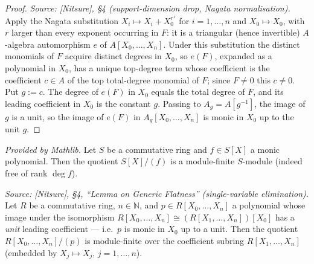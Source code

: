 \begin{proof}

\leanok
  \textit{Source: [Nitsure], \S4 (support-dimension drop, Nagata normalisation).}
  Apply the Nagata substitution \(X_i \mapsto X_i + X_0^{r^{\,i}}\) for \(i = 1, \dots, n\)
  and \(X_0 \mapsto X_0\), with \(r\) larger than every exponent occurring in \(F\): it is a
  triangular (hence invertible) \(A\)-algebra automorphism \(e\) of \(A[X_0, \dots, X_n]\).
  Under this substitution the distinct monomials of \(F\) acquire distinct degrees in
  \(X_0\), so \(e(F)\), expanded as a polynomial in \(X_0\), has a unique top-degree term
  whose coefficient is the coefficient \(c \in A\) of the top total-degree monomial of
  \(F\); since \(F \ne 0\) this \(c \ne 0\). Put \(g := c\). The degree of \(e(F)\) in
  \(X_0\) equals the total degree of \(F\), and its leading coefficient in \(X_0\) is the
  constant \(g\). Passing to \(A_g = A[g^{-1}]\), the image of \(g\) is a unit, so the
  image of \(e(F)\) in \(A_g[X_0, \dots, X_n]\) is monic in \(X_0\) up to the unit \(g\).
\end{proof}

\begin{lemma}
  \label{lem:polynomial_monic_quotient_finite}
  \mathlibok
  \textit{Provided by Mathlib.}
  Let \(S\) be a commutative ring and \(f \in S[X]\) a monic polynomial. Then the quotient
  \(S[X]/(f)\) is a module-finite \(S\)-module (indeed free of rank \(\deg f\)).
\end{lemma}

\begin{lemma}
  \label{lem:gf_mvPolynomial_quotient_finite_monic}
  \textit{Source: [Nitsure], \S4, ``Lemma on Generic Flatness'' (single-variable elimination).}
  Let \(R\) be a commutative ring, \(n \in \mathbb{N}\), and \(p \in R[X_0, \dots, X_n]\) a
  polynomial whose image under the isomorphism
  \(R[X_0, \dots, X_n] \cong (R[X_1, \dots, X_n])[X_0]\) has a \emph{unit} leading
  coefficient — i.e.\ \(p\) is monic in \(X_0\) up to a unit. Then the
  quotient \(R[X_0, \dots, X_n]/(p)\) is module-finite over the coefficient subring
  \(R[X_1, \dots, X_n]\) (embedded by \(X_j \mapsto X_j\), \(j = 1, \dots, n\)).
\end{lemma}

